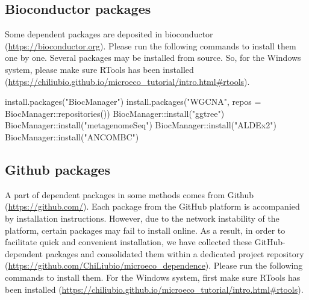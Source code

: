 \documentclass[
]{book}
\newenvironment{Shaded}{\begin{snugshade}}{\end{snugshade}}
\newcommand{\AttributeTok}[1]{\textcolor[rgb]{0.77,0.63,0.00}{#1}}
\newcommand{\FunctionTok}[1]{\textcolor[rgb]{0.00,0.00,0.00}{#1}}
\newcommand{\NormalTok}[1]{#1}
\newcommand{\SpecialCharTok}[1]{\textcolor[rgb]{0.00,0.00,0.00}{#1}}
\newcommand{\StringTok}[1]{\textcolor[rgb]{0.31,0.60,0.02}{#1}}
\begin{document}
\hypertarget{bioconductor-packages}{%
\subsection{Bioconductor packages}\label{bioconductor-packages}}

Some dependent packages are deposited in bioconductor (\url{https://bioconductor.org}).
Please run the following commands to install them one by one.
Several packages may be installed from source.
So, for the Windows system, please make sure RTools has been installed (\url{https://chiliubio.github.io/microeco_tutorial/intro.html\#rtools}).

\begin{Shaded}
\begin{Highlighting}[]
\FunctionTok{install.packages}\NormalTok{(}\StringTok{"BiocManager"}\NormalTok{)}
\FunctionTok{install.packages}\NormalTok{(}\StringTok{"WGCNA"}\NormalTok{, }\AttributeTok{repos =}\NormalTok{ BiocManager}\SpecialCharTok{::}\FunctionTok{repositories}\NormalTok{())}
\NormalTok{BiocManager}\SpecialCharTok{::}\FunctionTok{install}\NormalTok{(}\StringTok{"ggtree"}\NormalTok{)}
\NormalTok{BiocManager}\SpecialCharTok{::}\FunctionTok{install}\NormalTok{(}\StringTok{"metagenomeSeq"}\NormalTok{)}
\NormalTok{BiocManager}\SpecialCharTok{::}\FunctionTok{install}\NormalTok{(}\StringTok{"ALDEx2"}\NormalTok{)}
\NormalTok{BiocManager}\SpecialCharTok{::}\FunctionTok{install}\NormalTok{(}\StringTok{"ANCOMBC"}\NormalTok{)}
\end{Highlighting}
\end{Shaded}

\hypertarget{github-packages}{%
\subsection{Github packages}\label{github-packages}}

A part of dependent packages in some methods comes from Github (\url{https://github.com/}).
Each package from the GitHub platform is accompanied by installation instructions.
However, due to the network instability of the platform, certain packages may fail to install online.
As a result, in order to facilitate quick and convenient installation,
we have collected these GitHub-dependent packages and consolidated them within a dedicated project repository (\url{https://github.com/ChiLiubio/microeco_dependence}).
Please run the following commands to install them.
For the Windows system, first make sure RTools has been installed (\url{https://chiliubio.github.io/microeco_tutorial/intro.html\#rtools}).
\end{document}
